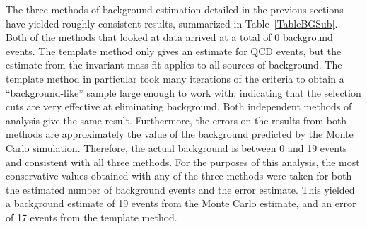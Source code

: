 The three methods of background estimation 
detailed in the previous sections have yielded 
roughly consistent results, 
summarized in Table~\ref{TableBGSub}.  
Both of the methods 
that looked at data arrived at a total 
of 0 background events.  
The template method only gives an estimate for 
QCD events, 
but the estimate from the invariant mass fit 
applies to all sources of background.  
The template method in particular 
took many iterations of the criteria 
to obtain a ``background-like'' sample 
large enough to work with, 
indicating 
that the selection 
cuts are very effective at eliminating background.  
Both independent 
methods of analysis give the same result.  
Furthermore, the errors on the results from 
both methods 
are approximately the value of the background 
predicted by the Monte Carlo simulation.  
Therefore, the actual background %
is between 0 and 19 events 
and consistent with 
all three methods.  
For the purposes of this analysis, 
the most conservative values obtained 
with any of the three methods were 
taken for both the estimated number 
of background events and the error estimate.  
This yielded a background estimate of 
19 events from the Monte Carlo estimate, 
and an error of 17 events from the template method.  

